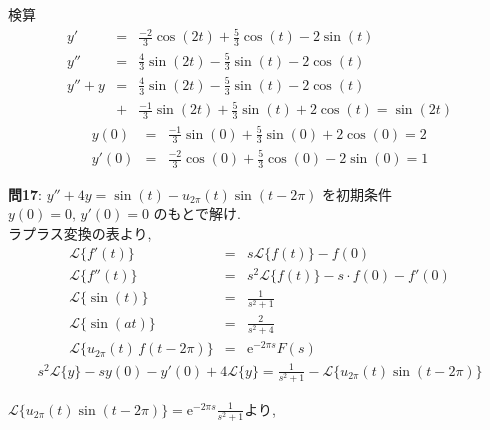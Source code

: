 ﻿\documentclass[a4j]{jarticle}
\begin{document}
検算
\begin{eqnarray*}
y'    &=& \frac{-2}{3}\cos(2t) + \frac{5}{3}\cos(t) - 2\sin(t) \\
y''   &=& \frac{4}{3}\sin(2t)  - \frac{5}{3}\sin(t) - 2\cos(t) \\
y''+y &=& \frac{4}{3}\sin(2t)  - \frac{5}{3}\sin(t) - 2\cos(t) \\
      &+& \frac{-1}{3}\sin(2t) + \frac{5}{3}\sin(t) + 2\cos(t) = \sin(2t)
\end{eqnarray*}
\begin{eqnarray*}
y(0)  &=& \frac{-1}{3}\sin(0) + \frac{5}{3}\sin(0) + 2\cos(0) = 2 \\
y'(0) &=& \frac{-2}{3}\cos(0) + \frac{5}{3}\cos(0) - 2\sin(0) = 1
\end{eqnarray*}

\noindent
\large{\bf{問17}}: \(y''+4y=\sin(t)-u_{2\pi}(t)\sin(t-2\pi) \) を初期条件 \( y(0)=0 ,\, y'(0)=0 \) のもとで解け. \\

ラプラス変換の表より,
\begin{eqnarray*}
                \mathcal{L} \{  f'(t) \} &=& s \mathcal{L} \{  f(t) \} - f(0) \\
               \mathcal{L} \{  f''(t) \} &=& s^2 \mathcal{L} \{  f(t) \} - s\cdot f(0) -f'(0)\\
               \mathcal{L} \{ \sin(t) \} &=& \frac{1}{s^2 + 1} \\
              \mathcal{L} \{ \sin(at) \} &=& \frac{2}{s^2 + 4} \\
\mathcal{L} \{ u_{2\pi}(t)\,f(t-2\pi) \} &=& \mathrm{e}^{-2\pi s}F(s)
\end{eqnarray*}
\begin{eqnarray*}
s^2 \mathcal{L} \{ y \} - s y(0) - y'(0) + 4 \mathcal{L} \{ y \} = \frac{1}{s^2+1} - \mathcal{L} \{ u_{2\pi}(t)\sin(t-2\pi) \}
\end{eqnarray*}

\( \mathcal{L} \{ u_{2\pi}(t)\sin(t-2\pi) \} =  \mathrm{e}^{-2\pi s}\frac{1}{s^2+1} \)より,
\end{document}
